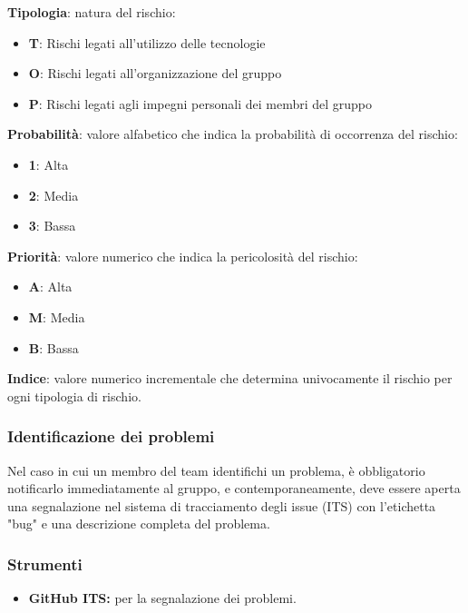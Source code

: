 \begin{flushleft}
    \textbf{Tipologia}: natura del rischio:
    \begin{itemize}
        \item \textbf{T}: Rischi legati all'utilizzo delle tecnologie 
        \item \textbf{O}: Rischi legati all'organizzazione del gruppo 
        \item \textbf{P}: Rischi legati agli impegni personali dei membri del gruppo 
    \end{itemize}
    \textbf{Probabilità}: valore alfabetico che indica la probabilità di occorrenza del rischio: 
    \begin{itemize}
        \item \textbf{1}: Alta 
        \item \textbf{2}: Media 
        \item \textbf{3}: Bassa 
    \end{itemize}
    \textbf{Priorità}: valore numerico che indica la pericolosità del rischio:
    \begin{itemize}
        \item \textbf{A}: Alta
        \item \textbf{M}: Media  
        \item \textbf{B}: Bassa 
    \end{itemize}
    \textbf{Indice}: valore numerico incrementale che determina univocamente il rischio per ogni tipologia di rischio.  
\end{flushleft}
\subsubsection{Identificazione dei problemi}
Nel caso in cui un membro del team identifichi un problema, è obbligatorio notificarlo immediatamente al gruppo, e contemporaneamente, deve essere aperta una segnalazione nel sistema di tracciamento degli issue (ITS) con l'etichetta "bug" e una descrizione completa del problema. 

\subsubsection{Strumenti}
\begin{itemize}
    \item \textbf{GitHub ITS:} 
        per la segnalazione dei problemi. 
\end{itemize}
